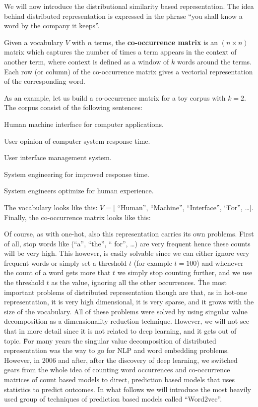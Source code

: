 We will now introduce the distributional similarity based representation. The idea behind distributed representation
is expressed in the phrase ``you shall know a word by the company it keeps''.

Given a vocabulary $V$ with $n$ terms, the \textbf{co-occurrence matrix} is an $(n \times n)$ matrix which captures
the number of times a term appears in the context of another term, where context is defined as a window of $k$ words
around the terms. Each row (or column) of the co-occurrence matrix gives a vectorial representation of the
corresponding word.
\ed

\be
As an example, let us build a co-occurrence matrix for a toy corpus with $k = 2$. The corpus consist of the following
sentences:
\bit
\item Human machine interface for computer applications.
\item User opinion of computer system response time.
\item User interface management system.
\item System engineering for improved response time.
\item System engineers optimize for human experience.
\eit

The vocabulary looks like this: $V = [$ ``Human'', ``Machine'', ``Interface'', ``For'', \ldots $]$. Finally, the
co-occurrence matrix looks like this:

\ee

Of course, as with one-hot, also this representation carries its own problems. First of all, stop words like (``a'',
``the'', `` for'', \ldots) are very frequent hence these counts will be very high. This however, is easily solvable
since we can either ignore very frequent words or simply set a threshold $t$ (for example $t=100$) and whenever the
count of a word gets more that $t$ we simply stop counting further, and we use the threshold $t$ as the value,
ignoring all the other occurrences. \v

The most important problems of distributed representation though are that, as in hot-one representation, it is very
high dimensional, it is very sparse, and it grows with the size of the vocabulary. All of these problems were solved
by using singular value decomposition as a dimensionality reduction technique. However, we will not see that in more
detail since it is not related to deep learning, and it gets out of topic. \v

For many years the singular value decomposition of distributed representation was the way to go for NLP and word
embedding problems. However, in 2006 and after, after the discovery of deep learning, we switched gears from the
whole idea of counting word occurrences and co-occurrence matrices of count based models to direct, prediction based
models that uses statistics to predict outcomes. In what follows we will introduce the most heavily used group of
techniques of prediction based models called ``Word2vec''.

